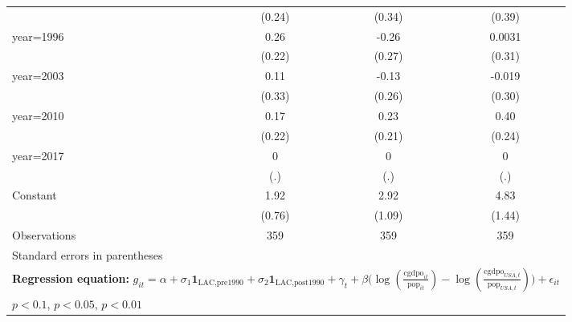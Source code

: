 \begin{sidewaystable}[htbp]
\begin{tabular}{l*{3}{c}}
                &   (0.24)         &   (0.34)         &   (0.39)         \\
\addlinespace
year=1996       &     0.26         &    -0.26         &   0.0031         \\
                &   (0.22)         &   (0.27)         &   (0.31)         \\
\addlinespace
year=2003       &     0.11         &    -0.13         &   -0.019         \\
                &   (0.33)         &   (0.26)         &   (0.30)         \\
\addlinespace
year=2010       &     0.17         &     0.23         &     0.40\sym{*}  \\
                &   (0.22)         &   (0.21)         &   (0.24)         \\
\addlinespace
year=2017       &        0         &        0         &        0         \\
                &      (.)         &      (.)         &      (.)         \\
\addlinespace
Constant        &     1.92\sym{**} &     2.92\sym{***}&     4.83\sym{***}\\
                &   (0.76)         &   (1.09)         &   (1.44)         \\
\midrule
Observations    &      359         &      359         &      359         \\
\bottomrule
\multicolumn{4}{l}{\footnotesize Standard errors in parentheses}\\
\multicolumn{4}{l}{\footnotesize \textbf{Regression equation:} \(g_{it} = \alpha + \sigma_1 \mathbf{1}_{\textrm{LAC,pre1990}} + \sigma_2 \mathbf{1}_{\textrm{LAC,post1990}} + \gamma_t + \beta \big(\log (\frac{\textrm{cgdpo}_{it}}{\textrm{pop}_{it}} ) - \log (\frac{\textrm{cgdpo}_{USA,t}}{\textrm{pop}_{USA,t}}  ) \big) + \epsilon_{it}\)}\\
\multicolumn{4}{l}{\footnotesize \sym{*} \(p<0.1\), \sym{**} \(p<0.05\), \sym{***} \(p<0.01\)}\\
\end{tabular}
\end{sidewaystable}
